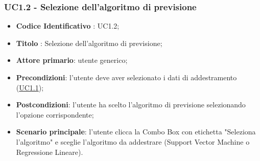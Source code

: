 		\subsubsection{UC1.2 - Selezione dell'algoritmo di previsione}
		\begin{itemize}
			\item\textbf{Codice Identificativo} : UC1.2;
			\item\textbf{Titolo} : Selezione dell'algoritmo di previsione;
			\item\textbf{Attore primario}: utente generico;
			\item\textbf{Precondizioni}: l'utente deve aver selezionato i dati di addestramento (\hyperref[par:UC1.1]{UC1.1});
			\item\textbf{Postcondizioni}: l'utente ha scelto l'algoritmo di previsione selezionando l'opzione corrispondente;
			\item\textbf{Scenario principale}: l'utente clicca la Combo Box con etichetta "Seleziona l'algoritmo" e sceglie l'algoritmo da addestrare (Support Vector Machine o Regressione Lineare).
		\end{itemize}
	
	\label{par:UC1.3}
